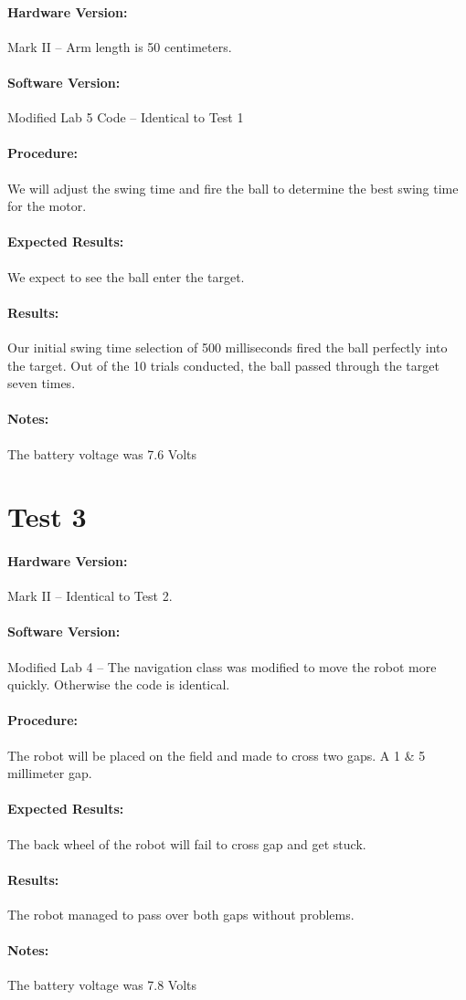 \documentclass[12pt,letterpaper]{article}
\begin{document}
		\paragraph{Hardware Version:}Mark II -- Arm length is 50 centimeters.
		\paragraph{Software Version:}Modified Lab 5 Code -- Identical to Test 1
		
		\paragraph{Procedure:} We will adjust the swing time and fire the ball to determine the best swing time for the motor.
		\paragraph{Expected Results:} We expect to see the ball enter the target.
		\paragraph{Results:} Our initial swing time selection of 500 milliseconds fired the ball perfectly into the target. Out of the 10 trials conducted, the ball passed through the target seven times.
		\paragraph{Notes:} The battery voltage was 7.6 Volts
		
	\section{Test 3}
		\paragraph{Hardware Version:}Mark II -- Identical to Test 2.
		\paragraph{Software Version:}Modified Lab 4 -- The navigation class was modified to move the robot more quickly. Otherwise the code is identical.
		
		\paragraph{Procedure:} The robot will be placed on the field and made to cross two gaps. A 1 \& 5 millimeter gap.
		\paragraph{Expected Results:} The back wheel of the robot will fail to cross gap and get stuck.
		\paragraph{Results:} The robot managed to pass over both gaps without problems.
		
		\paragraph{Notes:} The battery voltage was 7.8 Volts
	
\end{document}
